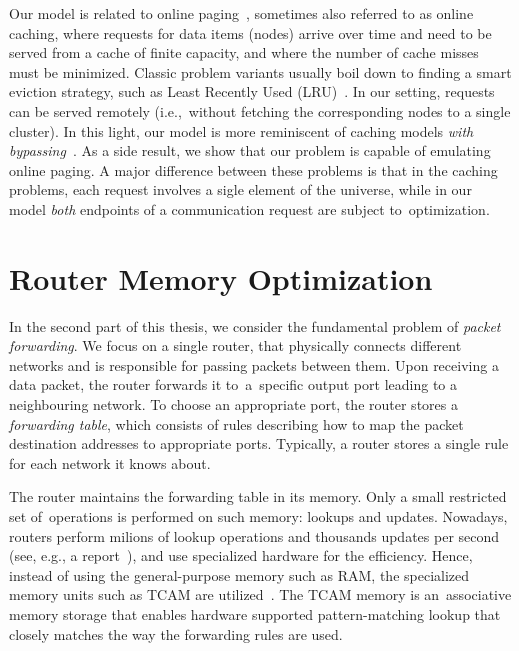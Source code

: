 Our model is related to online
paging~\cite{SleTar85,FKLMSY91,McGSle91,AcChNo00}, sometimes also referred to
as online caching, where requests for data items (nodes) arrive over time and
need to be served from a cache of finite capacity, and where the number of
cache misses must be minimized. Classic problem variants usually boil down to
finding a smart eviction strategy, such as Least Recently Used (LRU)~\cite{SleTar85}. In our
setting, requests can be served remotely (i.e.,~without fetching the
corresponding nodes to a single cluster). In this light, our model is more
reminiscent of caching models \emph{with
bypassing}~\cite{EpImLN11,EpImLN15,Irani02}. As a side result, we show that our problem is
capable of emulating online paging.
A major difference between  these problems is that in the caching problems, each request involves a sigle element of the universe, while in our model \emph{both} endpoints of a communication request are subject to~optimization.



\section{Router Memory Optimization}
\label{sec:intro-packet-forwarding}


In the second part of this thesis, we consider the fundamental problem of \emph{packet forwarding}.
We focus on a single router, that physically connects different networks and is responsible for passing packets between them.
Upon receiving a data packet, the router forwards it to~a~specific output port leading to a neighbouring network.
To choose an appropriate port, the router stores a \emph{forwarding table}, which consists of rules describing how to map the packet destination addresses to appropriate ports.
Typically, a router stores a single rule for each network it knows about.

The router maintains the forwarding table in its memory.
Only a small restricted set of~operations is performed on such memory: lookups and updates.
Nowadays, routers perform milions of lookup operations and thousands updates per second (see, e.g., a report~\cite{bgp-updates}), and use specialized hardware for the efficiency.
Hence, instead of using the general-purpose memory such as RAM, the specialized memory units such as TCAM are utilized~\cite{tcam-memory}.
The TCAM memory is an~associative memory storage that enables hardware supported pattern-matching lookup that closely matches the way the forwarding rules are used.

